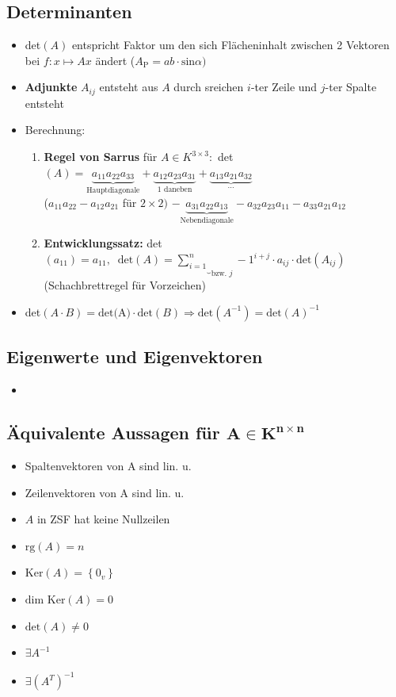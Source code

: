 \documentclass[10pt,a4paper]{article}
\begin{document}
\newpage
\subsection{Determinanten}
\begin{itemize}
\item det$(A)$ entspricht Faktor um den sich Flächeninhalt zwischen 2 Vektoren bei $f: x\mapsto Ax$ ändert ($A_{\text{P}}=ab\cdot \text{sin}\alpha)$ 


\item \textbf{Adjunkte} $A_{ij}$ entsteht aus $A$ durch sreichen $i$-ter Zeile und $j$-ter Spalte entsteht
\item Berechnung:
\begin{enumerate}
\item \textbf{Regel von Sarrus} für $A\in K^{3\times 3}:$ det$(A)=\underbrace{a_{11}a_{22}a_{33}}_{\text{Hauptdiagonale}}+\underbrace{a_{12}a_{23}a_{31}}_{\text{1 daneben}}+\underbrace{a_{13}a_{21}a_{32}}_{\dotsc}$\\
($a_{11}a_{22}-a_{12}a_{21}$ für $2\times 2)$
\hspace{2cm} $-\underbrace{a_{31}a_{22}a_{13}}_{\text{Nebendiagonale}}-a_{32}a_{23}a_{11}-a_{33}a_{21}a_{12}$
\item \textbf{Entwicklungssatz:} det$(a_{11})=a_{11}, \;\; \text{det}(A)=\underbrace{\sum_{i=1}^{n}}_{\text{bzw. }j}-1^{i+j}\cdot a_{ij}\cdot \text{det}(A_{ij})\;$ (Schachbrettregel für Vorzeichen)
\end{enumerate}
\item det$(A\cdot B)=\text{det(A)}\cdot \text{det}(B) \Rightarrow \text{det}(A^{-1})=\text{det}(A)^{-1}$
\end{itemize}



\subsection{Eigenwerte und Eigenvektoren}
\begin{itemize}
\item
\end{itemize}



\subsection{Äquivalente Aussagen für $\boldsymbol{A\in K^{n\times n}}$}
\begin{itemize}
\item Spaltenvektoren von A sind lin. u. 
\item Zeilenvektoren von A sind lin. u.
\item $A$ in ZSF hat keine Nullzeilen 
\item $\text{rg}(A)= n $
\item $\text{Ker}(A)=\left\lbrace 0_{v}\right\rbrace$
\item $\text{dim Ker}(A)=0$
\item $\text{det}(A)\neq 0$
\item $\exists A^{-1}$ 
\item $\exists (A^{T})^{-1}$
\end{itemize}
\end{document}
